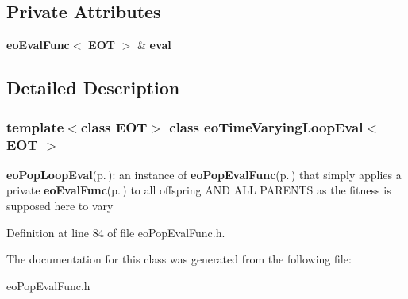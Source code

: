 \subsection*{Private Attributes}
\begin{CompactItemize}
\item 
{\bf eo\-Eval\-Func}$<$ {\bf EOT} $>$ \& {\bf eval}\label{classeo_time_varying_loop_eval_r0}

\end{CompactItemize}


\subsection{Detailed Description}
\subsubsection*{template$<$class EOT$>$ class eo\-Time\-Varying\-Loop\-Eval$<$ EOT $>$}

{\bf eo\-Pop\-Loop\-Eval}{\rm (p.\,\pageref{classeo_pop_loop_eval})}: an instance of {\bf eo\-Pop\-Eval\-Func}{\rm (p.\,\pageref{classeo_pop_eval_func})} that simply applies a private {\bf eo\-Eval\-Func}{\rm (p.\,\pageref{classeo_eval_func})} to all offspring AND ALL PARENTS as the fitness is supposed here to vary 



Definition at line 84 of file eo\-Pop\-Eval\-Func.h.

The documentation for this class was generated from the following file:\begin{CompactItemize}
\item 
eo\-Pop\-Eval\-Func.h\end{CompactItemize}
